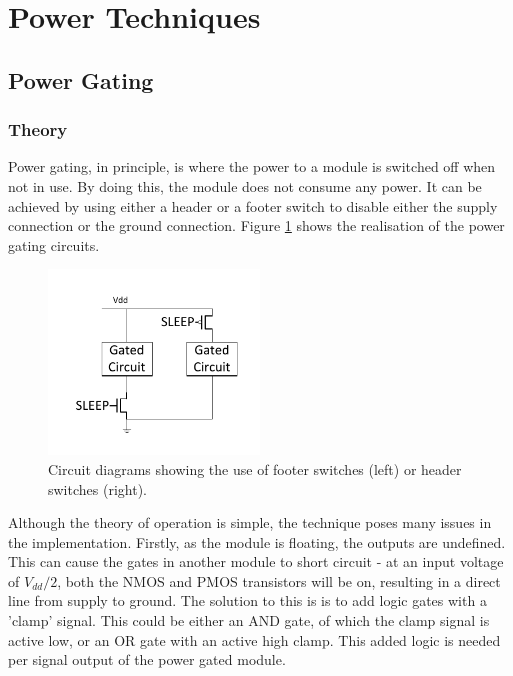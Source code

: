 
\section{Power Techniques}
\subsection{Power Gating}

\subsubsection{Theory}

Power gating, in principle, is where the power to a module is switched off when not in use. 
By doing this, the module does not consume any power. 
It can be achieved by using either a header or a footer switch to disable either the supply connection or the ground connection. 
Figure \ref{fig:powerswitches} shows the realisation of the power gating circuits.

\begin{figure}[h]
\includegraphics[width=0.5\textwidth]{Figures/powergating_switches.pdf}
\caption{Circuit diagrams showing the use of footer switches (left) or header switches (right).}
\label{fig:powerswitches}
\end{figure}

Although the theory of operation is simple, the technique poses many issues in the implementation.
Firstly, as the module is floating, the outputs are undefined.
This can cause the gates in another module to short circuit - at an input voltage of $ V_{dd} / 2 $, both the NMOS and PMOS transistors will be on, resulting in a direct line from supply to ground. 
The solution to this is is to add logic gates with a 'clamp' signal. 
This could be either an AND gate, of which the clamp signal is active low, or an OR gate with an active high clamp. 
This added logic is needed per signal output of the power gated module.

